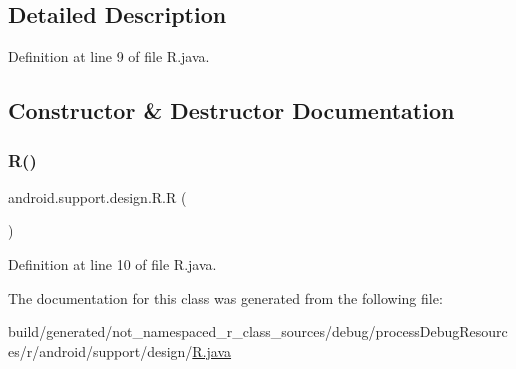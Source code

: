 \subsection{Detailed Description}


Definition at line 9 of file R.\+java.



\subsection{Constructor \& Destructor Documentation}
\mbox{\label{classandroid_1_1support_1_1design_1_1_r_ad1e86357443b87d6815db644f01672a1}} 
\subsubsection{\texorpdfstring{R()}{R()}}
{\footnotesize\ttfamily android.\+support.\+design.\+R.\+R (\begin{DoxyParamCaption}{ }\end{DoxyParamCaption})\hspace{0.3cm}{\ttfamily [private]}}



Definition at line 10 of file R.\+java.


\begin{DoxyCode}{0}

\end{DoxyCode}


The documentation for this class was generated from the following file\+:\begin{DoxyCompactItemize}
\item 
build/generated/not\+\_\+namespaced\+\_\+r\+\_\+class\+\_\+sources/debug/process\+Debug\+Resources/r/android/support/design/\mbox{\hyperlink{android_2support_2design_2_r_8java}{R.\+java}}\end{DoxyCompactItemize}
